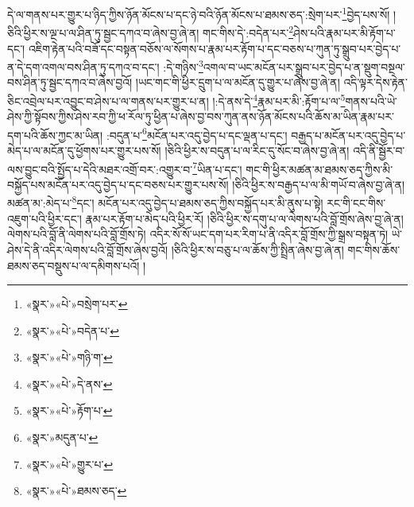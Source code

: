 དེ་ལ་གནས་པར་གྱུར་པ་ཉིད་ཀྱིས་ཉོན་མོངས་པ་དང་ཉེ་བའི་ཉོན་མོངས་པ་ཐམས་ཅད་:སྲེག་པར་\footnote{«སྣར་»«པེ་»བསྲེག་པར་}བྱེད་པས་སོ། །ཅིའི་ཕྱིར་ས་ལྔ་པ་ལ་ཤིན་ཏུ་སྦྱང་དཀའ་བ་ཞེས་བྱ་ཞེ་ན། གང་གིས་དེ་:བདེན་པར་\footnote{«སྣར་»«པེ་»བདེན་པ་}ཤེས་པའི་རྣམ་པར་མི་རྟོག་པ་དང་། འཇིག་རྟེན་པའི་བཟོ་དང་བསྟན་བཅོས་ལ་སོགས་པ་རྣམ་པར་རྟོག་པ་དང་བཅས་པ་ཀུན་ཏུ་སྒྲུབ་པར་བྱེད་པ་ན་དེ་དག་འགལ་བས་ཤིན་ཏུ་དཀའ་བ་དང་། :དེ་གཉིས་\footnote{«སྣར་»«པེ་»གཉི་ག་}འགལ་བ་ཡང་མངོན་པར་སྒྲུབ་པར་བྱེད་པ་ན་སྡུག་བསྔལ་བས་ཤིན་ཏུ་སྦྱང་དཀའ་བ་ཞེས་བྱའོ། །ཡང་གང་གི་ཕྱིར་དྲུག་པ་ལ་མངོན་དུ་གྱུར་པ་ཞེས་བྱ་ཞེ་ན། འདི་ལྟར་དེས་རྟེན་ཅིང་འབྲེལ་པར་འབྱུང་བ་ཤེས་པ་ལ་གནས་པར་གྱུར་པ་ན། །:དེ་ནས་དེ་\footnote{«སྣར་»«པེ་»དེ་ནས་}རྣམ་པར་མི་:རྟོག་པ་ལ་\footnote{«སྣར་»«པེ་»རྟོག་པ་}གནས་པའི་ཡེ་ཤེས་ཀྱི་སྟོབས་ཀྱིས་ཤེས་རབ་ཀྱི་ཕ་རོལ་ཏུ་ཕྱིན་པ་ཞེས་བྱ་བས་ཀུན་ནས་ཉོན་མོངས་པའི་ཆོས་མ་ཡིན་རྣམ་པར་དག་པའི་ཆོས་ཀྱང་མ་ཡིན། :བདུན་པ་\footnote{«སྣར་»མདུན་པ་}མངོན་པར་འདུ་བྱེད་པ་དང་ལྡན་པ་དང་། བརྒྱད་པ་མངོན་པར་འདུ་བྱེད་པ་མེད་པ་ལ་མངོན་དུ་ཕྱོགས་པར་གྱུར་པས་སོ། །ཅིའི་ཕྱིར་ས་བདུན་པ་ལ་རིང་དུ་སོང་བ་ཞེས་བྱ་ཞེ་ན། འདི་ནི་སྦྱོར་བ་ལས་བྱུང་བའི་སྤྱོད་པ་དེའི་མཐར་འགྲོ་བར་:འགྱུར་བ་\footnote{«སྣར་»«པེ་»གྱུར་པ་}ཡིན་པ་དང་། གང་གི་ཕྱིར་མཚན་མ་ཐམས་ཅད་ཀྱིས་མི་བསྐྱོད་པས་མངོན་པར་འདུ་བྱེད་པ་དང་བཅས་པར་གྱུར་པས་སོ། །ཅིའི་ཕྱིར་ས་བརྒྱད་པ་ལ་མི་གཡོ་བ་ཞེས་བྱ་ཞེ་ན། མཚན་མ་:མེད་པ་\footnote{«སྣར་»«པེ་»ཐམས་ཅད་}དང་། མངོན་པར་འདུ་བྱེད་པ་ཐམས་ཅད་ཀྱིས་བསྐྱོད་པར་མི་ནུས་པ་སྟེ། རང་གི་ངང་གིས་འཇུག་པའི་ཕྱིར་དང་། རྣམ་པར་རྟོག་པ་མེད་པའི་ཕྱིར་རོ། །ཅིའི་ཕྱིར་ས་དགུ་པ་ལ་ལེགས་པའི་བློ་གྲོས་ཞེས་བྱ་ཞེ་ན། ལེགས་པའི་བློ་ནི་ལེགས་པའི་བློ་གྲོས་ཏེ། འདིར་སོ་སོ་ཡང་དག་པར་རིག་པ་ནི་འདིར་བློ་གྲོས་ཀྱི་སྒྲས་བསྟན་ཏེ། ཡེ་ཤེས་དེ་ནི་འདིར་ལེགས་པའི་བློ་གྲོས་ཞེས་བྱའོ། །ཅིའི་ཕྱིར་ས་བཅུ་པ་ལ་ཆོས་ཀྱི་སྤྲིན་ཞེས་བྱ་ཞེ་ན། གང་གིས་ཆོས་ཐམས་ཅད་བསྡུས་པ་ལ་དམིགས་པའོ། །

